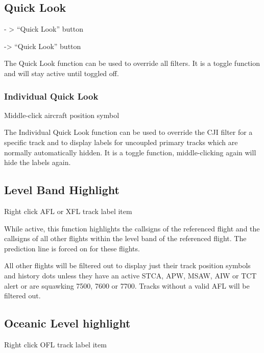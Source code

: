 \documentclass[a4paper,oneside,11pt]{memoir}
\begin{document}
\subsection{Quick Look}
\label{win:qlook}

 - > “Quick Look” button

 -> “Quick Look” button 


\bigskip

The Quick Look function can be used to override all filters. It is a toggle function and will stay active until toggled off.

\subsubsection{Individual Quick Look}

Middle-click aircraft position symbol

\bigskip

The Individual Quick Look function can be used to override the CJI filter for a specific track and to display labels for uncoupled primary tracks which are normally automatically hidden. It is a toggle function, middle-clicking again will hide the labels again.

\subsection{Level Band Highlight}\label{func:lbh}

Right click AFL or XFL track label item 

\bigskip

While active, this function highlights the callsigns of the referenced flight and the callsigns of all other flights within the level band of the referenced flight. The prediction line is forced on for these flights.

\bigskip

All other flights will be filtered out to display just their track position symbols and history dots unless they have an active STCA, APW, MSAW, AIW or TCT alert or are squawking 7500, 7600 or 7700. Tracks without a valid AFL will be filtered out.

\subsection{Oceanic Level highlight}\label{func:olh}

Right click OFL track label item 
\end{document}
